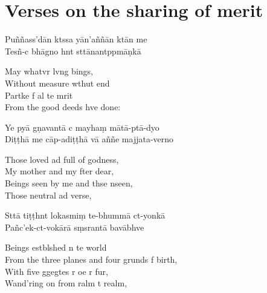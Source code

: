 \clearpage

\chapter[Sharing of Merit]{Verses on the sharing of merit}                                             %

\begin{leader}
\end{leader}

Puññass'dān ktssa yān'aññān ktān me\\
Tesñ-c bhāgno hnt sttānantppmāṇkā

\begin{english}
  May whatvr lvng bings,\\
  Without measure wthut end\\
  Partke f al te mrit\\
  From the good deeds hve done:
\end{english}

Ye pyā gṇavantā c mayhaṃ mātā-ptā-dyo\\
Diṭṭhā me cāp-adiṭṭhā vā aññe majjata-verno

\begin{english}
  Those loved ad full of godness,\\
  My mother and my fter dear,\\
  Beings seen by me and thse nseen,\\
  Those neutral ad verse,
\end{english}

Sttā tiṭṭhnt lokasmiṃ te-bhummā ct-yonkā\\
Pañc'ek-ct-vokārā sṃsrantā bavābhve

\begin{english}
  Beings estblshed n te world\\
  From the three planes and four grunds f birth,\\
  With five ggegtes r oe r fur,\\
  Wand'ring on from ralm t realm,
\end{english}

